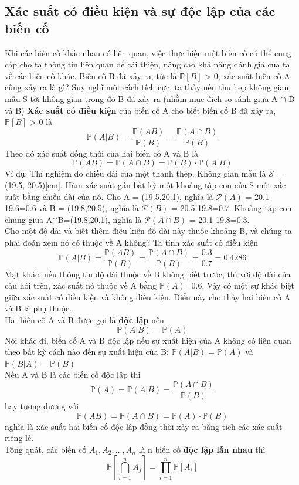 \documentclass[a4paper, 13pt]{report}
\begin{document}
\subsection*{Xác suất có điều kiện và sự độc lập của các biến cố}
Khi các biến cố khác nhau có liên quan, việc thực hiện một biến cố có thể cung cấp cho ta thông tin liên quan để cải thiện, nâng cao khả năng đánh giá của ta về các biến cố khác. Biến cố B đã xảy ra, tức là $\mathbb{P}[B]$ > 0, xác suất biến cố A cũng xảy ra là gì? Suy nghĩ một cách tích cực, ta thấy nên thu hẹp không gian mẫu S tới không gian trong đó B đã xảy ra (nhằm mục đích so sánh giữa A $\cap$ B và B)
\textbf{Xác suất có điều kiện} của biến cố A cho biết biến cố B đã xảy ra, $\mathbb{P}[B]$ > 0 là
\[
\mathbb{P}(A|B)=\frac{\mathbb{P}(AB)}{\mathbb{P}(B)}=\frac{\mathbb{P}(A\cap B)}{\mathbb{P}(B)}
\]
Theo đó xác suất đồng thời của hai biến cố A và B là
\[
\mathbb{P}(AB)=\mathbb{P}(A\cap B)=\mathbb{P}(B)\cdot \mathbb{P}(A|B)
\]
Ví dụ: Thí nghiệm đo chiều dài của một thanh thép. Không gian mẫu là $\mathcal{S}$ = (19.5, 20.5)[cm]. Hàm xác suất gán bất kỳ một khoảng tập con của S một xác suất bằng chiều dài của nó. Cho A = (19.5,20.1), nghĩa là $\mathcal{P}(A)$ = 20.1-19.6=0.6 và B = (19.8,20.5), nghĩa là $\mathcal{P}(B)$ = 20.5-19.8=0.7. Khoảng tập con chung giữa A$\cap$B=(19.8,20.1), nghĩa là $\mathcal{P}(A\cap B)$ = 20.1-19.8=0.3.\\
Cho một độ dài và biết thêm điều kiện độ dài này thuộc khoảng B, và chúng ta phải đoán xem nó có thuộc về A không? Ta tính xác suất có điều kiện
\[
\mathbb{P}(A|B)=\frac{\mathbb{P}(AB)}{\mathbb{P}(B)}=\frac{\mathbb{P}(A\cap B)}{\mathbb{P}(B)}=\frac{0.3}{0.7}=0.4286
\]
Mặt khác, nếu thông tin độ dài thuộc về B không biết trước, thì với độ dài của câu hỏi trên, xác suất nó thuộc về A bằng $\mathbb{P}(A)$=0.6. Vậy có một sự khác biệt giữa xác suất có điều kiện và không điều kiện. Điểu này cho thấy hai biến cố A và B là phụ thuộc.\\
Hai biến cố A và B được gọi là \textbf{độc lập} nếu
\[
\mathbb{P}(A|B)=\mathbb{P}(A)
\]
Nói khác đi, biến cố A và B độc lập nếu sự xuất hiện của A không có liên quan theo bất kỳ cách nào đến sự xuất hiện của B: $\mathbb{P}(A|B)=\mathbb{P}(A)$ và $\mathbb{P}(B|A)=\mathbb{P}(B)$\\
Nếu A và B là các biến cố độc lập thì 
\[
\mathbb{P}(A)=\mathbb{P}(A|B)=\frac{\mathbb{P}(A\cap B)}{\mathbb{P}(B)}
\]
hay tương đương với 
\[
\mathbb{P}(AB)=\mathbb{P}(A\cap B)=\mathbb{P}(A)\cdot\mathbb{P}(B)
\]
nghĩa là xác suất hai biến cố độc lâp đồng thời xảy ra bằng tích các xác suất riêng lẻ.\\
Tổng quát, các biến cố $A_{1}, A_{2},..., A_{n}$ là n biến cố \textbf{độc lập lẫn nhau} thì
\[
\mathbb{P}\left[\bigcap_{i=1}^n A_j \right] = \prod_{i=1}^n \mathbb{P}[A_i]
\]
\end{document}
